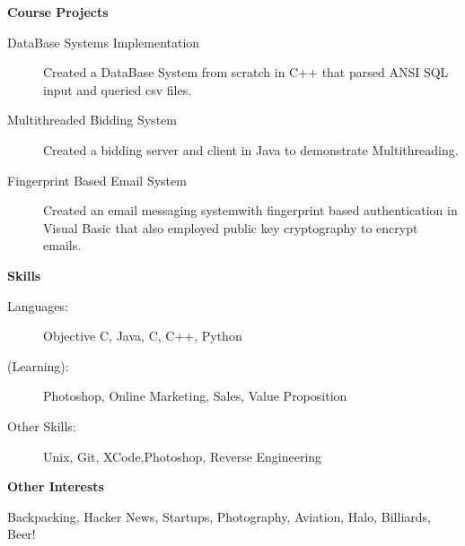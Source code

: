 \documentclass[letterpaper,11pt]{article}
\newcommand{\resheading}[1]{{\large \colorbox{mygrey}{\begin{minipage}{\textwidth}{\textbf{#1 \vphantom{p\^{E}}}}\end{minipage}}}}
\begin{document}
\vspace{1in}

\resheading{Course Projects}
\begin{description}
\item[DataBase Systems Implementation] Created a DataBase System from scratch in C++ that parsed ANSI SQL input and queried csv files.
\item[Multithreaded Bidding System] Created a bidding server and client in Java to demonstrate Multithreading.
\item[Fingerprint Based Email System] Created an email messaging systemwith fingerprint based authentication in Visual Basic that also employed public key cryptography to encrypt emails.
\end{description}

\resheading{Skills}
\begin{description}
\item[Languages:]
Objective C, Java, C, C++, Python
\item[(Learning):]
Photoshop, Online Marketing, Sales, Value Proposition
\item[Other Skills:]
Unix, Git, XCode,Photoshop, Reverse Engineering 
\end{description}



\resheading{Other Interests}
\begin{description}
\item Backpacking, Hacker News, Startups, Photography, Aviation, Halo, Billiards, Beer!
\end{description}
\end{document}
